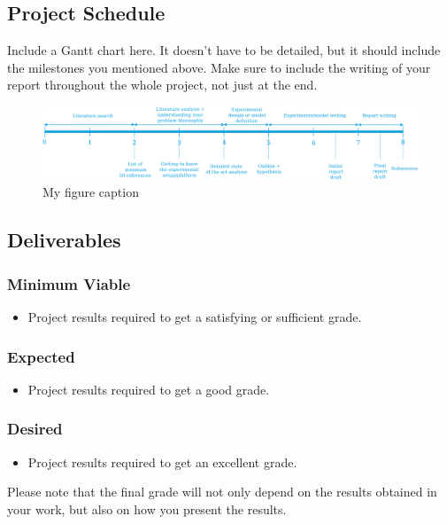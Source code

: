 \documentclass[thesis]{mas_proposal}
\begin{document}
\subsection{Project Schedule}
Include a Gantt chart here. It doesn't have to be detailed, but it should include the milestones you mentioned above.
Make sure to include the writing of your report throughout the whole project, not just at the end.

\begin{figure}[h!]
    \includegraphics[width=\textwidth]{images/rnd_deliverable_timeline}
    \caption{My figure caption}
    \label{fig:myfigure}
\end{figure}

\subsection{Deliverables}

\subsubsection*{Minimum Viable}
\begin{itemize}
    \item Project results required to get a satisfying or sufficient grade.
\end{itemize}

\subsubsection*{Expected}
\begin{itemize}
    \item Project results required to get a good grade.
\end{itemize}

\subsubsection*{Desired}
\begin{itemize}
    \item Project results required to get an excellent grade.
\end{itemize}

Please note that the final grade will not only depend on the results obtained in your work, but also on how you present the results.

\nocite{*}

\end{document}
